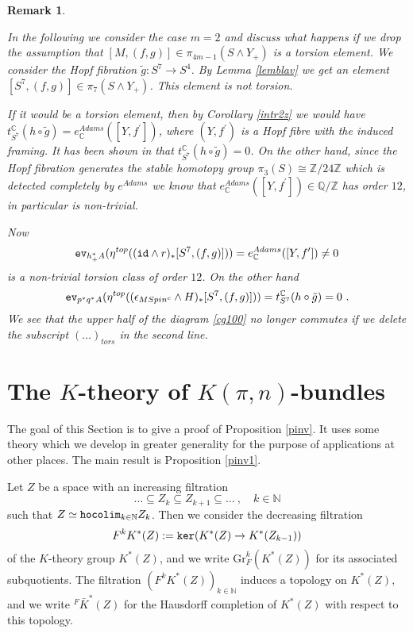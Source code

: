 \documentclass[12pt]{article}
\newtheorem{rem}[theorem]{Remark}
\newcommand{\Gr}{\mathrm{Gr}}
\newcommand{\hocolim}{{\tt hocolim}}
\newcommand{\ev}{{\tt ev}}
\newcommand{\id}{{\tt id}}
\renewcommand{\ker}{{\tt ker}}
\newcommand{\nat}{{\mathbb{N}}}
\newcommand{\Z}{{\mathbb{Z}}}
\newcommand{\Q}{{\mathbb{Q}}}
\newcommand{\C}{{\mathbb{C}}}
\begin{document}
\begin{rem}\label{hiurfhrifhfx}{\rm In the following we consider the case $m=2$ and discuss what happens if we  drop the assumption that $[M,(f,g)]\in \pi_{4m-1}(S\wedge Y_{+})$ is a torsion element.
We consider the Hopf fibration $\tilde g:S^{7}\to S^{4}$. By Lemma \ref{lemblav} we get an element
$[S^{7},(f,g)]\in \pi_{7}(S\wedge Y_{+})$.  This element is not torsion.



 If it would be a torsion element,
then by Corollary \ref{intr2z} we would have $t^{\C}_{S^{7}}(h\circ \tilde g)=e_{\C}^{Adams}([Y,f^{\prime}])$,
where $(Y,f^{\prime})$ is a Hopf fibre with the induced framing.
It has been shown in \cite[Example 3.5]{2010arXiv1012.5237C} that
$t^{\C}_{S^{7}}(h\circ \tilde g)=0$. On the other hand, since
the Hopf fibration generates the stable homotopy group $\pi_{3}(S)\cong \Z/24\Z$ which is detected completely by $e^{Adams}$ we know that $e_{\C}^{Adams}([Y,f^{\prime}])\in \Q/\Z$
has order $12$, in particular is non-trivial.


Now $$\ev_{h_{+}^{*}A}(\eta^{top}((\id\wedge r)_{*}[S^{7},(f,g)]))  = e_{\C}^{Adams}([Y,f^{\prime}])\not=0$$  is a non-trivial torsion class of order $12$. 
On the other hand $$\ev_{p^{*}q^{*}A}(\eta^{top}((\epsilon_{MSpin^{c}}\wedge H)_{*}[S^{7},(f,g)]))=t^{\C}_{S^{7}}(h\circ \tilde g)=0\ .$$
We see that the upper half of the diagram \eqref{cg100} no longer commutes if we delete the subscript
 $(\dots)_{tors}$ in the second line.}\end{rem}




\section{The $K$-theory of $K(\pi,n)$-bundles}\label{hdklqwjdlqwdwqd}

\color{black}

The goal of this Section is to give a 
 proof of   Proposition \ref{pinv}. It uses some theory which we develop in greater generality for the purpose of applications at other places. The main result is Proposition \ref{pinv1}.  
 \bigskip
 
 
Let $Z$ be a space with an increasing filtration  $$\dots\subseteq Z_{k}\subseteq Z_{k+1}\subseteq\dots\ , \quad k\in \nat$$ such that $Z \simeq \hocolim_{k\in \nat}Z_{k}$. Then we consider the decreasing filtration
$$F^{k}K^{*}(Z):=\ker(K^{*}(Z)\to K^{*}(Z_{k-1}))$$
of the $K$-theory group $K^{*}(Z)$, and we write $\Gr^{k}_{F}(K^{*}(Z))$ for its associated 
subquotients. The filtration $(F^{k}K^{*}(Z))_{k\in \nat}$ induces a topology on $K^{*}(Z)$, and we write
${}^{F}\bar K^{*}(Z)$ for the Hausdorff completion of $K^{*}(Z)$ with respect to this topology. 
\end{document}
